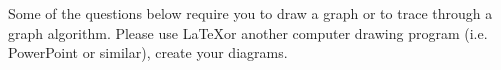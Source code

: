 \documentclass[addpoints,11pt]{exam}
\begin{document}
\pagestyle{empty}


\\
\\

%
%
%
\noprintanswers


Some of the questions below require you to draw a graph or to trace through a graph algorithm.  Please use \LaTeX or another computer drawing program (i.e. PowerPoint or similar), create your diagrams.
\end{document}
